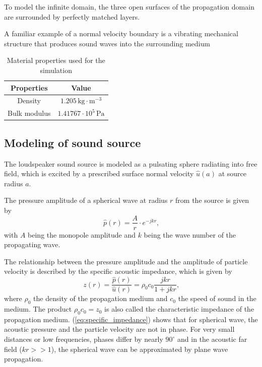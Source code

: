 To model the infinite domain, the three open surfaces of the propagation domain are surrounded by perfectly matched layers.


A familiar example of a normal velocity boundary is a vibrating mechanical structure that produces sound waves into the surrounding medium



\begin{table}[H]
	\centering
	\caption{Material properties used for the simulation}
	\begin{tabular}{|c|c|}
		\hline
		\textbf{Properties} & \textbf{Value}                   \\ \hline
		Density             &  $1.205\,\text{kg}\cdot \text{m}^{-3}$                     \\ \hline
		Bulk modulus        &  $1.41767\cdot10^5\,\text{Pa}$ \\ \hline
	\end{tabular}
\end{table}

\subsection*{Modeling of sound source}

The loudspeaker sound source is modeled as a pulsating sphere radiating into free field, which is excited by a prescribed surface normal velocity $\hat{u}(a)$ at source radius $a$.

The pressure amplitude of a spherical wave at radius $r$ from the source is given by
\begin{equation}
	\hat{p}(r) = \frac{A}{r}\cdot e^{-jkr}\text{,}
\end{equation}
with $A$ being the monopole amplitude and $k$ being the wave number of the propagating wave.

The relationship between the pressure amplitude and the amplitude of particle velocity is described by the specific acoustic impedance, which is given by
\begin{equation}
	z(r) = \frac{\hat{p}(r)}{\hat{u}(r)} = \rho_0 c_0\frac{jkr}{1+jkr}\text{,} \label{eq:specific_impedance}
\end{equation}
where $\rho_0$ the density of the propagation medium and $c_0$ the speed of sound in the medium. The product $\rho_0 c_0 = z_0$ is also called the characteristic impedance of the propagation medium. (\ref{eq:specific_impedance}) shows that for spherical wave, the acoustic pressure and the particle velocity are not in phase. For very small distances or low frequencies, phases differ by nearly $90^{\circ}$ and in the acoustic far field ($kr >> 1$), the spherical wave can be approximated by plane wave propagation.

